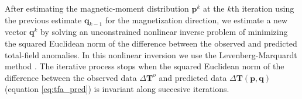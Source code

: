 After estimating the magnetic-moment distribution $\mathbf{p}^k$ at the $k$th iteration using the previous estimate $\mathbf{q}_{k-1}$ for the magnetization direction, we estimate a new vector $\mathbf{q}^{k}$ by solving an unconstrained nonlinear inverse problem of minimizing the squared Euclidean norm of the difference between the observed and predicted total-field anomalies. In this nonlinear inversion we use the Levenberg-Marquardt method \citep{aster_2005}. The iterative process stops when the squared Euclidean norm of the difference between the observed data $\Delta \mathbf{T}^{o}$ and predicted data $\Delta\mathbf{T}(\mathbf{p}, \mathbf{q})$ (equation \ref{eq:tfa_pred}) is invariant along succesive iterations.

%
%
%
%





